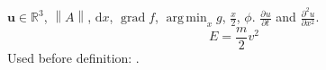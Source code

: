 \documentclass{article}
\newcommand{\vel}[1]{\mathbf{#1}}
\newcommand{\R}{\mathbb{R}}
\newcommand{\norm}[1]{\left\lVert#1\right\rVert}
\newcommand*{\dd}{\mathrm{d}}
\DeclareMathOperator{\grad}{grad}
\DeclareMathOperator*{\argmin}{arg\,min}
\newcommand{\pder}[3][]{\frac{\partial^{#1} #2}{\partial #3^{#1}}}
\def\half#1{\frac{#1}{2}}
\let\oldphi\phi
\newcommand{\be}{\begin{equation}}
\newcommand{\ee}{\end{equation}}
\begin{document}
$\vel{u} \in \R^3$, $\norm{A}$, $\dd x$, $\grad f$, $\argmin_x g$, $\half{x}$, $\oldphi$.
$\pder{u}{t}$ and $\pder[2]{u}{x}$.
\be
E = \half{m} v^2
\ee
Used before definition: \later.
\newcommand{\later}{defined later}
\end{document}
